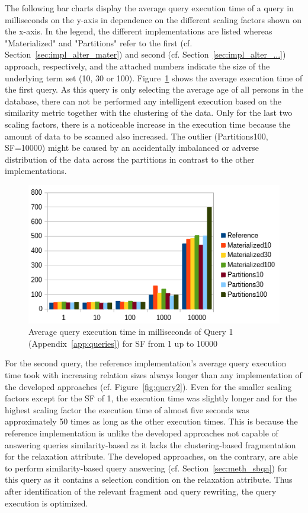 The following bar charts display the average query execution time of a query in milliseconds on the y-axis in dependence on the different scaling factors shown
on the x-axis. In the legend, the different implementations are listed whereas "Materialized" and "Partitions" refer to the first 
(cf. Section~\ref{sec:impl_alter_mater}) and second (cf. Section~\ref{sec:impl_alter_...}) approach, respectively, and the attached numbers indicate the size of 
the underlying term set (10, 30 or 100).
Figure~\ref{fig:query1} shows the average execution time of the first query. As this query is only selecting the average age of all persons in the database, there
can not be performed any intelligent execution based on the similarity metric together with the clustering of the data. Only for the last two scaling factors, 
there is a noticeable increase in the execution time because the amount of data to be scanned also increased. The outlier (Partitions100, SF=10000) might be 
caused by an accidentally imbalanced or adverse distribution of the data across the partitions in contrast to the other implementations.
\begin{figure}[h]
    \centering
    \includegraphics[scale=0.8]{charts/Query1.png}
    \caption{Average query execution time in milliseconds of Query 1 (Appendix~\ref{app:queries}) for SF from 1 up to 10000}
    \label{fig:query1}
\end{figure}

For the second query, the reference implementation's average query execution time took with increasing relation sizes always longer than any implementation 
of the developed approaches (cf. Figure~\ref{fig:query2}). Even for the smaller scaling factors except for the SF of 1, the execution time was slightly longer 
and for the highest scaling factor the execution time of almost five seconds was approximately 50 times as long as the other execution times. This is because the
reference implementation is unlike the developed approaches not capable of answering queries similarity-based as it lacks the clustering-based fragmentation for
the relaxation attribute. The developed approaches, on the contrary, are able to perform similarity-based query answering (cf. Section~\ref{sec:meth_sbqa}) for 
this query as it contains a selection condition on the relaxation attribute. Thus after identification of the relevant fragment and query rewriting, the query 
execution is optimized.

